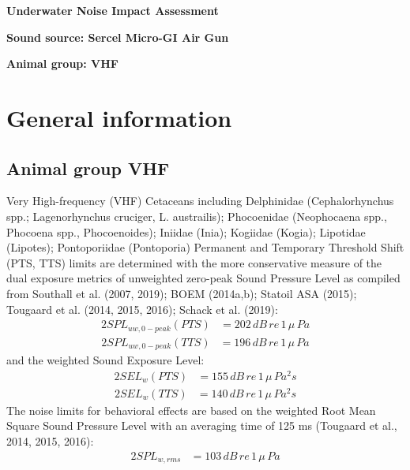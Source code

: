 \documentclass{article}%
\begin{document}
%
\normalsize%
\pagestyle{header}%
\begin{minipage}{\textwidth}%
\centering%
\begin{Large}%
\textbf{Underwater Noise Impact Assessment}%
\end{Large}%
\linebreak%
\linebreak%
\begin{large}%
\textbf{Sound source: Sercel Micro{-}GI Air Gun}%
\end{large}%
\linebreak%
\begin{large}%
\textbf{Animal group: VHF}%
\end{large}%
\end{minipage}%
\section{General information}%
\label{sec:Generalinformation}%
\subsection{Animal group VHF}%
\label{subsec:AnimalgroupVHF}%
Very High{-}frequency (VHF) Cetaceans including Delphinidae (Cephalorhynchus spp.; Lagenorhynchus cruciger, L. austrailis); Phocoenidae (Neophocaena spp., Phocoena spp., Phocoenoides); Iniidae (Inia); Kogiidae (Kogia); Lipotidae (Lipotes); Pontoporiidae (Pontoporia)\newline%
%
\linebreak%
Permanent and Temporary Threshold Shift (PTS, TTS) limits are determined                         with the more conservative measure of the dual exposure metrics                       of unweighted zero{-}peak Sound Pressure Level as compiled from                      Southall et al. (2007, 2019); BOEM (2014a,b); Statoil ASA (2015);                       Tougaard et al. (2014, 2015, 2016); Schack et al. (2019): %
\begin{alignat*}{2}%
SPL_{uw,0-peak}(PTS) &=%
202%
\,dB\,re\,1\,\mu\,Pa%
\end{alignat*}%
\begin{alignat*}{2}%
SPL_{uw,0-peak}(TTS) &=%
196%
\,dB\,re\,1\,\mu\,Pa%
\end{alignat*}%
 and the weighted Sound Exposure Level:%
\begin{alignat*}{2}%
SEL_{w}(PTS) &=%
155%
\,dB\,re\,1\,\mu\,Pa^2 s%
\end{alignat*}%
\begin{alignat*}{2}%
SEL_{w}(TTS) &=%
140%
\,dB\,re\,1\,\mu\,Pa^2 s%
\end{alignat*}%
The noise limits for behavioral effects are based on the weighted Root                         Mean Square Sound Pressure Level with an averaging time of 125 ms (Tougaard et al., 2014, 2015, 2016):%
\begin{alignat*}{2}%
SPL_{w,rms} &=%
103%
\,dB\,re\,1\,\mu\,Pa%
\end{alignat*}%
\newpage
\end{document}
